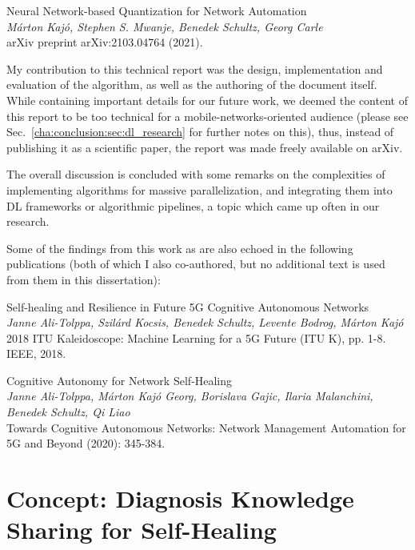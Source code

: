 	\begin{publication}
		Neural Network-based Quantization for Network Automation \\
		\textit{Márton Kajó, Stephen S. Mwanje, Benedek Schultz, Georg Carle} \\
		arXiv preprint arXiv:2103.04764 (2021).
	\end{publication}

	My contribution to this technical report was the design, implementation and evaluation of the algorithm, as well as the authoring of the document itself.
	While containing important details for our future work, we deemed the content of this report to be too technical for a mobile-networks-oriented audience (please see Sec.~\ref{cha:conclusion:sec:dl_research} for further notes on this), thus, instead of publishing it as a scientific paper, the report was made freely available on arXiv.
	
	The overall discussion is concluded with some remarks on the complexities of implementing algorithms for massive parallelization, and integrating them into \ac{DL} frameworks or algorithmic pipelines, a topic which came up often in our research.

	Some of the findings from this work as are also echoed in the following publications (both of which I also co-authored, but no additional text is used from them in this dissertation):
	
	\begin{publication}
		Self-healing and Resilience in Future 5G Cognitive Autonomous Networks \\
		\textit{Janne Ali-Tolppa, Szilárd Kocsis, Benedek Schultz, Levente Bodrog, Márton Kajó} \\
		2018 ITU Kaleidoscope: Machine Learning for a 5G Future (ITU K), pp. 1-8. IEEE, 2018.
	\end{publication}

	\begin{publication}
		Cognitive Autonomy for Network Self‐Healing \\
		\textit{Janne Ali-Tolppa, Márton Kajó Georg, Borislava Gajic, Ilaria Malanchini, Benedek Schultz, Qi Liao} \\
		Towards Cognitive Autonomous Networks: Network Management Automation for 5G and Beyond (2020): 345-384.
	\end{publication}

	\section{Concept: Diagnosis Knowledge Sharing for Self-Healing}
		\label{cha:quantization:sec:knowledge_sharing}
		
